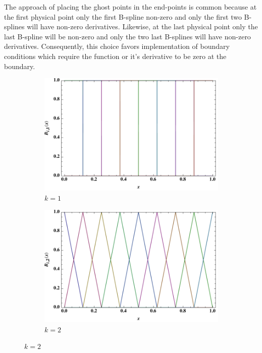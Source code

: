 The approach of placing the ghost points in the end-points is common because at the first physical point only the first B-spline non-zero and only the first two B-splines will have non-zero derivatives. Likewise, at the last physical point only the last B-spline will be non-zero and only the two last B-splines will have non-zero derivatives. Consequently, this choice favors implementation of boundary conditions which require the function or it's derivative to be zero at the boundary.

\begin{figure}[htbp!]
	\centering
	\begin{adjustwidth}{-1cm}{-1cm}
	\begin{subfigure}{0.6\textwidth}
	\centering
	\includegraphics[width=\linewidth]{Bsp1.pdf}
	\caption{$k=1$}
\end{subfigure}%
\begin{subfigure}{0.6\textwidth}
	\centering
	\includegraphics[width=\linewidth]{Bsp2.pdf}
	\caption{$k=2$}
\end{subfigure}%


\end{adjustwidth}
\end{figure}
